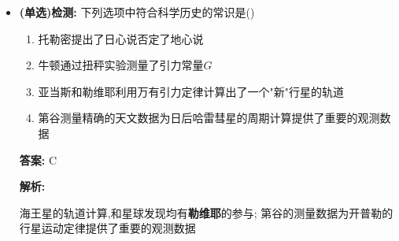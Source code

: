 \documentclass{article}
\begin{document}
\begin{itemize}
\begin{enumerate}
            \hspace{-1em}\begin{adjustbox}{minipage=0.91\linewidth, bgcolor=gray!20, padding=1em}
                \small %
                石英丝连接细杆,两端放置等大质量球,在两球附近放置两大质量球产生引力矩,用光线反射法放大扭转 

                \vspace{-1em}

                $$ \theta \propto \text{力矩} \quad \lra  \quad k\theta = 2F_{G}L \quad (k\text{为比例系数需提前测量}) $$
            \end{adjustbox}

            \vspace{-1em}

            \item 亚当斯和勒维耶利用万有引力定律计算出了"新"行星的轨道
            \item 伽勒和勒维耶发现了这颗行星,后被命名为海王星
            \item 哈雷利用万有引力预言了同一彗星的按时回归,后被命名为"哈雷彗星"
            \item 钱学森被誉为"中国航天之父",地球同步卫星的(赤道)轨道高度$36000km$
            \item 阿姆斯特朗:人类登月第一人 \quad 杨利伟:中国登月第一人
        \end{enumerate}

        \vspace{0.5em}

        \item[] \textbf{(单选)检测:} 下列选项中符合科学历史的常识是(\qquad)
        
        \begin{enumerate}[label=\Alph*.]
            \item 托勒密提出了日心说否定了地心说
            \item 牛顿通过扭秤实验测量了引力常量$G$
            \item 亚当斯和勒维耶利用万有引力定律计算出了一个"新"行星的轨道
            \item 第谷测量精确的天文数据为日后哈雷彗星的周期计算提供了重要的观测数据
        \end{enumerate}

        \textbf{答案:} C

        \textbf{解析:} 
        
        \hspace{2em}海王星的轨道计算,和星球发现均有\textbf{勒维耶}的参与;
        第谷的测量数据为开普勒的行星运动定律提供了重要的观测数据


\end{itemize}
\end{document}
